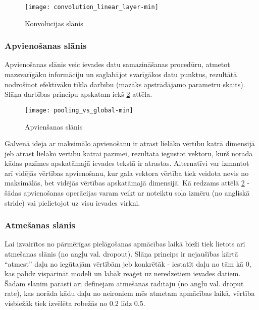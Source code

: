 \begin{figure}[H]
	\texttt{[image: convolution\_linear\_layer-min]}
	\caption{Konvolūcijas slānis \cite{TextCNNLena}}
	\label{fig:convolution_linear_layer}
\end{figure}

\subsubsection{Apvienošanas slānis}

Apvienošanas slānis veic ievades datu samazināšanas procedūru, atmetot mazsvarīgāku informāciju un saglabājot svarīgākos datu punktus, rezultātā nodrošinot efektīvāku tīkla darbību (mazāks apstrādājamo parametru skaits). Slāņa darbības principu apskatam iekš \ref{fig:pooling_vs_global} attēla.

\begin{figure}[H]
	\texttt{[image: pooling\_vs\_global-min]}
	\caption{Apvienšanas slānis \cite{TextCNNLena}}
	\label{fig:pooling_vs_global}
\end{figure}

Galvenā ideja ar maksimālo apvienošanu ir atrast lielāko vērtību katrā dimensijā jeb atrast lielāko vērtību katrai pazīmei, rezultātā iegūstot vektoru, kurš norāda kādas pazīmes apskatāmajā ievades tekstā ir atrastas. Alternatīvi var izmantot arī vidējās vērtības apvienošanu, kur gala vektora vērtība tiek veidota nevis no maksimālās, bet vidējās vērtības apskatāmajā dimensijā. Kā redzams attēlā \ref{fig:pooling_vs_global} - šādas apvienošanas operācijas varam veikt ar noteiktu soļa izmēru (no angliskā stride) vai pielietojot uz visu ievades virkni. 

\subsubsection{Atmešanas slānis}
Lai izvairītos no pārmērīgas pielāgošanas apmācības laikā bieži tiek lietots arī atmešanas slānis (no angļu val. dropout). Slāņa princips ir nejaušības kārtā “atmest” daļu no iegūtajām vērtībām jeb konkrētāk - iestatīt daļu no tām kā 0, kas palīdz vispārināt modeli un labāk reaģēt uz neredzētiem ievades datiem. Šādam slānim parasti arī definējam atmešanas rādītāju (no angļu val. droput rate), kas norāda kādu daļu no neironiem mēs atmetam apmācības laikā, vērtība visbiežāk tiek izvēlēta robežās no 0.2 līdz 0.5.


